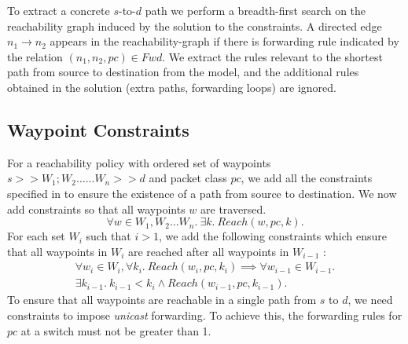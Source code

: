 To extract a concrete $s$-to-$d$ path we 
perform a breadth-first search on the reachability graph induced by the solution to the constraints. 
A directed edge $n_1 \rightarrow n_2$ appears in the reachability-graph if there is forwarding rule indicated by the relation $(n_1,n_2, pc) \in Fwd$. 
We extract the rules relevant to the shortest path from source to destination from the model, and the additional rules obtained in the solution (extra paths, forwarding loops) are ignored.  

\subsection{Waypoint Constraints} 
For a reachability policy with ordered set of waypoints $s >> W_1;W_2 \ldots ... W_n >> d$ and packet class $pc$, we add all the constraints specified in  to ensure the existence of a path from source to destination. We now add constraints so that all waypoints $w$
are traversed. 
\begin{equation} \label{eq:waypoints}
	\forall w \in W_1, W_2 \ldots W_n. \ \exists k.~Reach(w, pc, k).
\end{equation}
For each set $W_i$  such that $i>1$, we add the following constraints which ensure that all waypoints
in $W_i$ are reached after all waypoints in $W_{i - 1}$ : 
\begin{multline}
\forall w_{i} \in W_{i}, \forall k_i.~Reach(w_i, pc, k_i) \implies 
\forall w_{i - 1} \in W_{i-1}. \\ \exists k_{i-1}. \ 
 k_{i-1} < k_{i} \wedge Reach(w_{i-1}, pc, k_{i-1}).
\end{multline}
To ensure that all waypoints are reachable in a single path from
$s$ to $d$, we need constraints to impose {\em unicast} forwarding. To achieve
this, the forwarding rules for $pc$ at a switch must not be greater than 1. 
